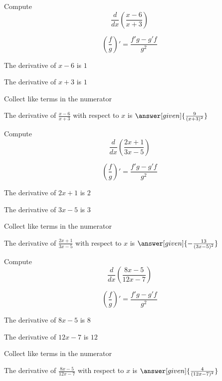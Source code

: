 \documentclass{ximera}
\begin{document}
\begin{question} %
  Compute
  \[
  \frac{d}{dx} \left(\frac{x-6}{x+3}\right)
  \]
  
    \begin{hint}
      \[\left(\frac{f}{g}\right)' = \frac{f'g-g'f}{g^2}\]
    \end{hint}
    \begin{hint}
      The derivative of $x-6$ is $1$
    \end{hint}
    \begin{hint}
      The derivative of $x+3$ is $1$
    \end{hint}
    \begin{hint}
      Collect like terms in the numerator
    \end{hint}
		The derivative of $\frac{x-6}{x+3}$ with respect to $x$ is
		 $\answer[given]{\frac{9}{(x+3)^2}}$
		
\end{question}


\begin{question} %
  Compute
  \[
  \frac{d}{dx} \left(\frac{2x+1}{3x-5}\right)
  \]
  
    \begin{hint}
      \[\left(\frac{f}{g}\right)' = \frac{f'g-g'f}{g^2}\]
    \end{hint}
    \begin{hint}
      The derivative of $2x+1$ is $2$
    \end{hint}
    \begin{hint}
      The derivative of $3x-5$ is $3$
    \end{hint}
    \begin{hint}
      Collect like terms in the numerator
    \end{hint}
		The derivative of $\frac{2x+1}{3x-5}$ with respect to $x$ is
		 $\answer[given]{-\frac{13}{(3x-5)^2}}$
		
\end{question}


\begin{question} %
  Compute
  \[
  \frac{d}{dx} \left(\frac{8x-5}{12x - 7}\right)
  \]
  
    \begin{hint}
      \[\left(\frac{f}{g}\right)' = \frac{f'g-g'f}{g^2}\]
    \end{hint}
    \begin{hint}
      The derivative of $8x-5$ is $8$
    \end{hint}
    \begin{hint}
      The derivative of $12x-7$ is $12$
    \end{hint}
    \begin{hint}
      Collect like terms in the numerator
    \end{hint}
		The derivative of $\frac{8x-5}{12x-7}$ with respect to $x$ is
		 $\answer[given]{\frac{4}{(12x-7)^2}}$
		
\end{question}
\end{document}
